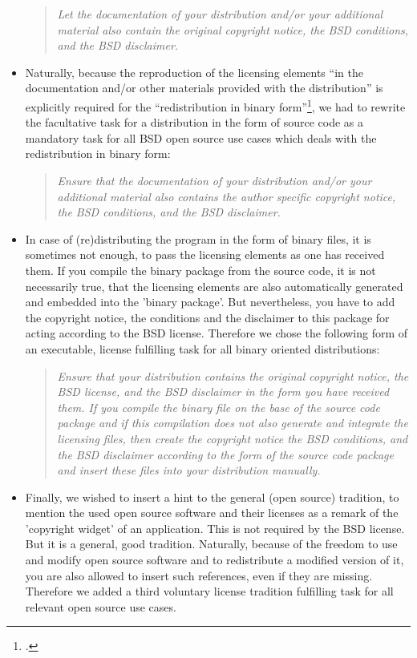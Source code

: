 \begin{itemize}
\begin{quote}\textit{Let the documentation of your distribution and/or your
additional material also contain the original copyright notice, the BSD
conditions, and the BSD disclaimer.}\end{quote}

\item Naturally, because the reproduction of the licensing elements \enquote{in
the documentation and/or other materials provided with the distribution}
is explicitly required for the \enquote{redistribution in binary
form}\footcite[cf.][\nopage wp]{BsdLicense2Clause}, we had to rewrite the
facultative task for a distribution in the form of source code as a mandatory task
for all BSD open source use cases which deals with the redistribution in binary
form:

\begin{quote}\textit{Ensure that the documentation of your distribution and/or
your additional material also contains the author specific copyright notice, the
BSD conditions, and the BSD disclaimer.}\end{quote}

\item In case of (re)distributing the program in the form of binary files, it is
sometimes not enough, to pass the licensing elements as one has received them.
If you compile the binary package from the source code, it is not necessarily
true, that the licensing elements are also automatically generated and embedded
into the 'binary package'. But nevertheless, you have to add the copyright
notice, the conditions and the disclaimer to this package for acting according
to the BSD license. Therefore we chose the following form of an executable,
license fulfilling task for all binary oriented distributions:

\begin{quote}\textit{Ensure that your distribution contains the original
copyright notice, the BSD license, and the BSD disclaimer in the form you have
received them. If you compile the binary file on the base of the source code
package and if this compilation does not also generate and integrate the
licensing files, then create the copyright notice the BSD conditions, and the
BSD disclaimer according to the form of the source code package and insert these
files into your distribution manually.}\end{quote}

\item Finally, we wished to insert a hint to the general (open source)
tradition, to mention the used open source software and their licenses as a
remark of the 'copyright widget' of an application. This is not required by the
BSD license. But it is a general, good tradition. Naturally, because of the
freedom to use and modify open source software and to redistribute a modified
version of it, you are also allowed to insert such references, even if they are
missing. Therefore we added a third voluntary license tradition fulfilling
task for all relevant open source use cases.

\end{itemize}

%

